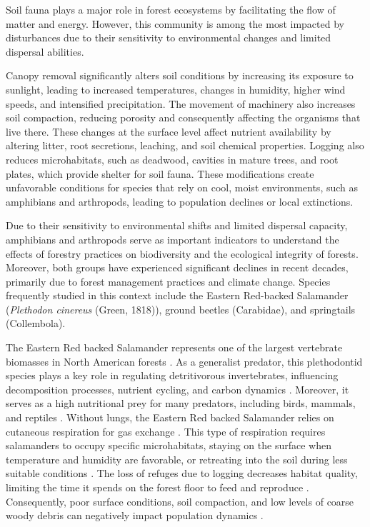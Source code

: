 %

Soil fauna plays a major role in forest ecosystems by facilitating the flow of matter and energy. 
However, this community is among the most impacted by disturbances due to their sensitivity to environmental changes and limited dispersal abilities.

Canopy removal significantly alters soil conditions by increasing its exposure to sunlight, leading to increased temperatures, changes in humidity, higher wind speeds, and intensified precipitation. 
The movement of machinery also increases soil compaction, reducing porosity and consequently affecting the organisms that live there.
These changes at the surface level affect nutrient availability by altering litter, root secretions, leaching, and soil chemical properties. 
Logging also reduces microhabitats, such as deadwood, cavities in mature trees, and root plates, which provide shelter for soil fauna. 
These modifications create unfavorable conditions for species that rely on cool, moist environments, such as amphibians and arthropods, leading to population declines or local extinctions.

Due to their sensitivity to environmental shifts and limited dispersal capacity, amphibians and arthropods serve as important indicators to understand the effects of forestry practices on biodiversity and the ecological integrity of forests. 
Moreover, both groups have experienced significant declines in recent decades, primarily due to forest management practices and climate change. 
Species frequently studied in this context include the Eastern Red-backed Salamander (\textit{Plethodon cinereus} (Green, 1818)), ground beetles (Carabidae), and springtails (Collembola).

The Eastern Red backed Salamander represents one of the largest vertebrate biomasses in North American forests \citep{Burton1975Salamanderpopulations,Petranka1993Effectstimber,semlitschAbundanceBiomassProduction2014a}. 
As a generalist predator, this plethodontid species plays a key role in regulating detritivorous invertebrates, influencing decomposition processes, nutrient cycling, and carbon dynamics \citep{Burton1975Energyflow,Wyman1998Experimentalassessment,Walton2013Topdownregulation,Hickerson2017Easternredbacked}. 
Moreover, it serves as a high nutritional prey for many predators, including birds, mammals, and reptiles \citep{Burton1975Energyflow,Pough1987abundancesalamanders}. 
Without lungs, the Eastern Red backed Salamander relies on cutaneous respiration for gas exchange \citep{Heatwole1961Relationsubstrate}. 
This type of respiration requires salamanders to occupy specific microhabitats, staying on the surface when temperature and humidity are favorable, or retreating into the soil during less suitable conditions \citep{Grizzell1949HibernationSite,FraserEmpiricalEvaluation1976,Jaeger1980MicrohabitatsTerrestrial}. 
The loss of refuges due to logging decreases habitat quality, limiting the time it spends on the forest floor to feed and reproduce \citep{Achat2015Quantifyingconsequences,Peele2017Effectswoody}. 
Consequently, poor surface conditions, soil compaction, and low levels of coarse woody debris can negatively impact population dynamics \citep{Peterman2014Spatialvariation}. 

